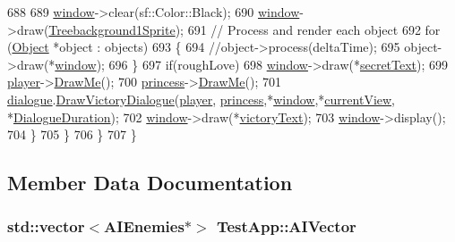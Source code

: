 \begin{DoxyCode}
688 
689                 \hyperlink{classTestApp_a0b6b080a777092db64519ef7c4309105}{window}->clear(sf::Color::Black);
690                 \hyperlink{classTestApp_a0b6b080a777092db64519ef7c4309105}{window}->draw(\hyperlink{classTestApp_a3cc57075ee88b4efd811e9a0ebac1d04}{Treebackground1Sprite});
691                 \textcolor{comment}{// Process and render each object}
692                 \textcolor{keywordflow}{for} (\hyperlink{classObject}{Object} *\textcolor{keywordtype}{object} : objects)
693                 \{
694                     \textcolor{comment}{//object->process(deltaTime);}
695                     \textcolor{keywordtype}{object}->draw(*\hyperlink{classTestApp_a0b6b080a777092db64519ef7c4309105}{window});
696                 \}
697                 \textcolor{keywordflow}{if}(roughLove)
698                     \hyperlink{classTestApp_a0b6b080a777092db64519ef7c4309105}{window}->draw(*\hyperlink{classTestApp_a9ec0950ad6b860a2e88a9450811afcb1}{secretText});
699                 \hyperlink{classTestApp_a72c21fba56a65699606328b9e765d6db}{player}->\hyperlink{classPlayerObject_a510e91305c929bb86d7628b87b0d7e39}{DrawMe}();
700                 \hyperlink{classTestApp_a99d5d1cabf9afb7550bac5a504f72875}{princess}->\hyperlink{classPrincessObject_a530610d0d21f1ec24e0d5af175ebc6eb}{DrawMe}();
701                 \hyperlink{classTestApp_ac6f79ce85fbafdaff4e64156a7e29761}{dialogue}.\hyperlink{classDialogue_af466664e3113b83d063a112090229691}{DrawVictoryDialogue}(\hyperlink{classTestApp_a72c21fba56a65699606328b9e765d6db}{player},
      \hyperlink{classTestApp_a99d5d1cabf9afb7550bac5a504f72875}{princess},*\hyperlink{classTestApp_a0b6b080a777092db64519ef7c4309105}{window},*\hyperlink{classTestApp_ae638230755c6ce4c99ce5f0376f67302}{currentView}, *\hyperlink{classTestApp_ab17fb7269fa0caf564a3f462f2e16b4a}{DialogueDuration});
702                 \hyperlink{classTestApp_a0b6b080a777092db64519ef7c4309105}{window}->draw(*\hyperlink{classTestApp_a11b6f78ad8d0e5eaf77971cbf8cbe723}{victoryText});
703                 \hyperlink{classTestApp_a0b6b080a777092db64519ef7c4309105}{window}->display();
704             \}
705         \}
706     \}
707 \}
\end{DoxyCode}


\subsection{Member Data Documentation}
\subsubsection[{\texorpdfstring{A\+I\+Vector}{AIVector}}]{\setlength{\rightskip}{0pt plus 5cm}std\+::vector$<${\bf A\+I\+Enemies}$\ast$$>$ Test\+App\+::\+A\+I\+Vector\hspace{0.3cm}{\ttfamily [protected]}}\hypertarget{classTestApp_aaea1384b8c39b22595b4e583e4edc972}{}\label{classTestApp_aaea1384b8c39b22595b4e583e4edc972}
